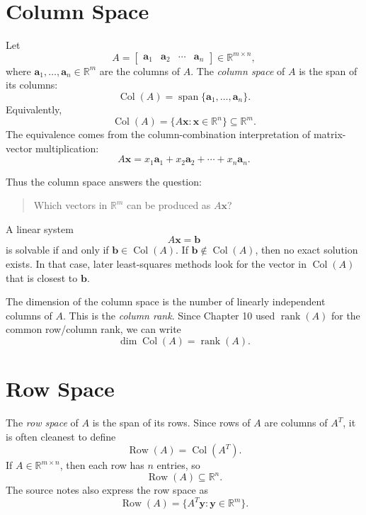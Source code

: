 \section{Column Space}
\label{mf:column-space}

Let
\[
    A=\begin{bmatrix}
        \mathbf{a}_1 & \mathbf{a}_2 & \cdots & \mathbf{a}_n
    \end{bmatrix}
    \in\mathbb{R}^{m\times n},
\]
where \(\mathbf{a}_1,\ldots,\mathbf{a}_n\in\mathbb{R}^m\) are the columns of \(A\). The \emph{column space} of \(A\) is the span of its columns:
\[
    \operatorname{Col}(A)
    =\operatorname{span}\{\mathbf{a}_1,
    \ldots,\mathbf{a}_n\}.
\]
Equivalently,
\[
    \operatorname{Col}(A)
    =\{A\mathbf{x}:\mathbf{x}\in\mathbb{R}^n\}
    \subseteq \mathbb{R}^m.
\]
The equivalence comes from the column-combination interpretation of matrix-vector multiplication:
\[
    A\mathbf{x}=x_1\mathbf{a}_1+x_2\mathbf{a}_2+\cdots+x_n\mathbf{a}_n.
\]

Thus the column space answers the question:

\begin{quote}
Which vectors in \(\mathbb{R}^m\) can be produced as \(A\mathbf{x}\)?
\end{quote}

A linear system
\[
    A\mathbf{x}=\mathbf{b}
\]
is solvable if and only if \(\mathbf{b}\in\operatorname{Col}(A)\). If \(\mathbf{b}\notin\operatorname{Col}(A)\), then no exact solution exists. In that case, later least-squares methods look for the vector in \(\operatorname{Col}(A)\) that is closest to \(\mathbf{b}\).

The dimension of the column space is the number of linearly independent columns of \(A\). This is the \emph{column rank}. Since Chapter 10 used \(\operatorname{rank}(A)\) for the common row/column rank, we can write
\[
    \dim\operatorname{Col}(A)=\operatorname{rank}(A).
\]

\section{Row Space}
\label{mf:row-space}

The \emph{row space} of \(A\) is the span of its rows. Since rows of \(A\) are columns of \(A^T\), it is often cleanest to define
\[
    \operatorname{Row}(A)=\operatorname{Col}(A^T).
\]
If \(A\in\mathbb{R}^{m\times n}\), then each row has \(n\) entries, so
\[
    \operatorname{Row}(A)\subseteq \mathbb{R}^n.
\]
The source notes also express the row space as
\[
    \operatorname{Row}(A)=\{A^T\mathbf{y}:\mathbf{y}\in\mathbb{R}^m\}.
\]

